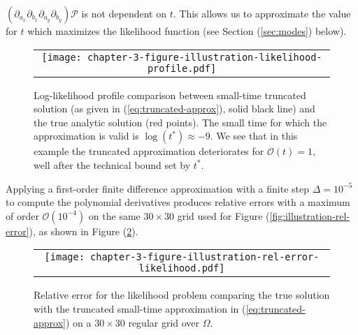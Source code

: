 $\left(\partial_{a_x}\partial_{b_x} \partial_{a_y}\partial_{b_y}
\right)\mathcal{P}$ is not dependent on $t$. This allows us to
approximate the value for $t$ which maximizes the likelihood function
(see Section (\ref{sec:modes}) below).
\begin{figure}
  \begin{tabular}{c}
    \begin{minipage}{0.90\textwidth}
      \centering
      \texttt{[image: chapter-3-figure-illustration-likelihood-profile.pdf]}
      \caption{Log-likelihood profile comparison between small-time
        truncated solution (as given in (\ref{eq:truncated-approx}),
        solid black line) and the true analytic solution (red
        points). The small time for which the approximation is valid
        is $\log(t^*) \approx -9$. We see that in this example the
        truncated approximation deteriorates for $\mathcal{O}(t) = 1$,
        well after the technical bound set by $t^*$.}
      \label{fig:illustration-likelihood-profile}
    \end{minipage}
  \end{tabular}
\end{figure}
Applying a first-order finite difference approximation with a finite
step $\Delta = 10^{-5}$ to compute the polynomial derivatives produces
relative errors with a maximum of order $\mathcal{O}(10^{-4})$ on the
same $30 \times 30$ grid used for Figure
(\ref{fig:illustration-rel-error}), as shown in Figure
(\ref{fig:illustration-rel-error-likelihood}).
\begin{figure}
  \centering
  \begin{tabular}{c}
    \begin{minipage}{0.50\textwidth}
      \centering
      \texttt{[image: chapter-3-figure-illustration-rel-error-likelihood.pdf]}
      \caption{Relative error for the likelihood problem comparing the
        true solution with the truncated small-time approximation in
        (\ref{eq:truncated-approx}) on a $30 \times 30$ regular grid
        over $\Omega$. }
      \label{fig:illustration-rel-error-likelihood}
    \end{minipage}
    \end{tabular}
\end{figure}

